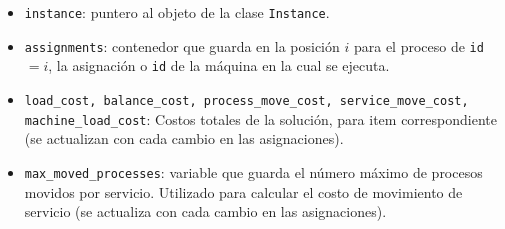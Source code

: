 \documentclass[../informe2.tex]{subfiles}
\begin{document}
\vspace{0.75cm}

\noindent\begin{minipage}{0.55\textwidth}
	\small
	\begin{itemize}[leftmargin=*]
		\item \texttt{instance}: puntero al objeto de la clase \texttt{Instance}.
		\item \texttt{assignments}: contenedor que guarda en la posición $i$ para el proceso de \texttt{id} $=i$, la asignación o \texttt{id} de la máquina en la cual se ejecuta.
		\item \texttt{load\_cost, balance\_cost, process\_move\_cost, service\_move\_cost, machine\_load\_cost}: Costos totales de la solución, para item correspondiente (se actualizan con cada cambio en las asignaciones).
		\item \texttt{max\_moved\_processes}: variable que guarda el número máximo de procesos movidos por servicio. Utilizado para calcular el costo de movimiento de servicio (se actualiza con cada cambio en las asignaciones).
	\end{itemize}
\end{minipage}\hfill
\begin{minipage}{0.4\textwidth}
\end{minipage}
\end{document}
